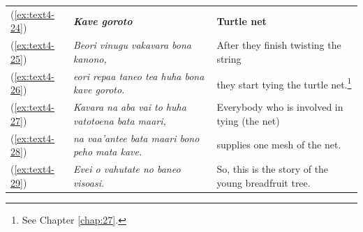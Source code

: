 \documentclass[output=paper]{langscibook}
\begin{document}
\begin{xltabular}{\textwidth}{lXX}
    (\ref{ex:text4-24})&\textit{\textbf{Kave goroto}}&\textbf{Turtle net}\\
    (\ref{ex:text4-25})&\textit{Beori vinugu vakavara bona kanono,}&After they finish twisting the string\\
    (\ref{ex:text4-26})&\textit{eori repaa taneo tea huha bona kave goroto.}&they start tying the turtle net.\footnote{See Chapter \ref{chap:27}.}\\
    (\ref{ex:text4-27})&\textit{Kavara na aba vai to huha vatotoena bata maari,}&Everybody who is involved in tying (the net)\\
    (\ref{ex:text4-28})&\textit{na vaa'antee bata maari bono peho mata kave.}&supplies one mesh of the net.\\
    (\ref{ex:text4-29})&\textit{Evei o vahutate no baneo visoasi.}&So, this is the story of the young breadfruit tree.\\
\end{xltabular}
\end{document}
